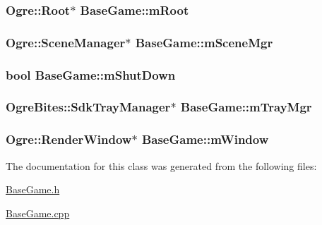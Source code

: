 \hypertarget{classBaseGame_a22226146323391088351624576b7891c}{
\subsubsection[{m\-Root}]{\setlength{\rightskip}{0pt plus 5cm}Ogre\-::\-Root$\ast$ Base\-Game\-::m\-Root\hspace{0.3cm}{\ttfamily [protected]}}}\label{classBaseGame_a22226146323391088351624576b7891c}
\hypertarget{classBaseGame_a9ea629769242d9e7fb6f8680ba8aa9fd}{
\subsubsection[{m\-Scene\-Mgr}]{\setlength{\rightskip}{0pt plus 5cm}Ogre\-::\-Scene\-Manager$\ast$ Base\-Game\-::m\-Scene\-Mgr\hspace{0.3cm}{\ttfamily [protected]}}}\label{classBaseGame_a9ea629769242d9e7fb6f8680ba8aa9fd}
\hypertarget{classBaseGame_a2eba80c12350640bc99c7e9fc0d250da}{
\subsubsection[{m\-Shut\-Down}]{\setlength{\rightskip}{0pt plus 5cm}bool Base\-Game\-::m\-Shut\-Down\hspace{0.3cm}{\ttfamily [protected]}}}\label{classBaseGame_a2eba80c12350640bc99c7e9fc0d250da}
\hypertarget{classBaseGame_a7629d875df44ac5a66f408c859115801}{
\subsubsection[{m\-Tray\-Mgr}]{\setlength{\rightskip}{0pt plus 5cm}Ogre\-Bites\-::\-Sdk\-Tray\-Manager$\ast$ Base\-Game\-::m\-Tray\-Mgr\hspace{0.3cm}{\ttfamily [protected]}}}\label{classBaseGame_a7629d875df44ac5a66f408c859115801}
\hypertarget{classBaseGame_a6ecc10c576668a3940357e8cb3b4e404}{
\subsubsection[{m\-Window}]{\setlength{\rightskip}{0pt plus 5cm}Ogre\-::\-Render\-Window$\ast$ Base\-Game\-::m\-Window\hspace{0.3cm}{\ttfamily [protected]}}}\label{classBaseGame_a6ecc10c576668a3940357e8cb3b4e404}


The documentation for this class was generated from the following files\-:\begin{DoxyCompactItemize}
\item 
\hyperlink{BaseGame_8h}{Base\-Game.\-h}\item 
\hyperlink{BaseGame_8cpp}{Base\-Game.\-cpp}\end{DoxyCompactItemize}
